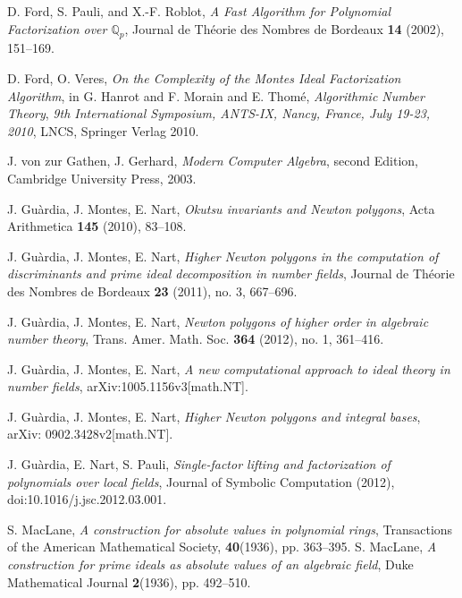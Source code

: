 \documentclass{amsart}
\begin{document}
\begin{thebibliography}{}

D. Ford, S. Pauli, and X.-F. Roblot,
\emph{A Fast Algorithm for Polynomial Factorization over ${\mathbb Q}_p$},
Journal de Th\'eorie des Nombres de Bordeaux
\textbf{14} (2002), 151--169.

 D. Ford, O. Veres, \emph{On the Complexity of the Montes Ideal Factorization Algorithm}, in G. Hanrot and F. Morain and E. {Thom\'e},
\emph{Algorithmic Number Theory},
\emph{9th International Symposium, ANTS-IX, Nancy, France, July 19-23, 2010},
LNCS, Springer Verlag 2010.

J. von zur Gathen, J. Gerhard, \emph{Modern Computer Algebra}, second Edition, Cambridge University Press, 2003.

J. Gu\`{a}rdia, J.  Montes, E.  Nart, \emph{Okutsu invariants and Newton polygons}, Acta Arithmetica {\bf145} (2010), 83--108.

J. Gu\`{a}rdia, J.  Montes, E.  Nart, \emph{Higher  Newton polygons in the computation of discriminants and prime ideal decomposition in number fields},
Journal de Th\'eorie des Nombres de Bordeaux {\bf 23} (2011), no. 3, 667--696.

J. Gu\`{a}rdia, J. Montes, E. Nart, \emph{Newton polygons of higher order in algebraic number theory}, Trans. Amer. Math. Soc.  {\bf 364} (2012), no. 1, 361--416.

J. Gu\`{a}rdia, J. Montes, E.  Nart, \emph{A new computational approach to ideal theory in number fields},  arXiv:1005.1156v3[math.NT].

 J. Gu\`ardia, J. Montes, E. Nart, \emph{Higher Newton polygons and integral bases}, arXiv: 0902.3428v2[math.NT].

J. Gu\`{a}rdia, E.  Nart, S. Pauli, \emph{Single-factor lifting and factorization of polynomials over local fields}, Journal of Symbolic Computation (2012), doi:10.1016/j.jsc.2012.03.001.

 S. MacLane, \emph{A construction for absolute values in polynomial rings}, Transactions of the American Mathematical Society, {\bf40}(1936), pp. 363--395.
 S. MacLane, \emph{A construction for prime ideals as absolute values of an algebraic field}, Duke Mathematical Journal {\bf2}(1936), pp. 492--510.


\end{thebibliography}
\end{document}
